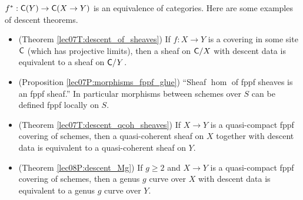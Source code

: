  $f^*:\text{\sf C}(Y)\to \text{\sf C}(X\to Y)$ is an equivalence of categories. Here are some examples of
 descent theorems.
 \begin{itemize}
   \item (Theorem \ref{lec07T:descent_of_sheaves}) If $f:X\to Y$ is a covering in
   some site $\text{\sf C}$ (which has projective limits), then a sheaf on $\text{\sf C}/X$ with descent data
   is equivalent to a sheaf on $\text{\sf C}/Y$.

   \item (Proposition \ref{lec07P:morphisms_fppf_glue}) ``Sheaf $\hom$ of fppf sheaves is
   an fppf sheaf.'' In particular morphisms between schemes over $S$ can be defined fppf locally on $S$.


   \item (Theorem \ref{lec07T:descent_qcoh_sheaves}) If $X\to Y$ is a quasi-compact
   fppf covering of schemes, then a quasi-coherent sheaf on $X$ together with descent
   data is equivalent to a quasi-coherent sheaf on $Y$.

   \item (Theorem \ref{lec08P:descent_Mg}) If $g\ge 2$ and $X\to Y$ is a quasi-compact
   fppf covering of schemes, then a genus $g$ curve over $X$ with descent data is
   equivalent to a genus $g$ curve over $Y$.
 \end{itemize}

